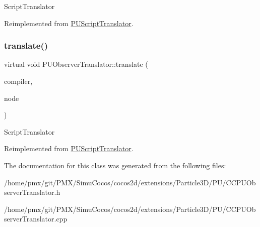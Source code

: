 Script\+Translator 

Reimplemented from \hyperlink{classPUScriptTranslator_a9ff2cdfda9ea8db6fd716e7b69dbe79b}{P\+U\+Script\+Translator}.

\mbox{\label{classPUObserverTranslator_a06d960394aa02aecdc5208c0aefb18ac}} 
\subsubsection{\texorpdfstring{translate()}{translate()}\hspace{0.1cm}{\footnotesize\ttfamily [2/2]}}
{\footnotesize\ttfamily virtual void P\+U\+Observer\+Translator\+::translate (\begin{DoxyParamCaption}\item[{\hyperlink{classPUScriptCompiler}{P\+U\+Script\+Compiler} $\ast$}]{compiler,  }\item[{\hyperlink{classPUAbstractNode}{P\+U\+Abstract\+Node} $\ast$}]{node }\end{DoxyParamCaption})\hspace{0.3cm}{\ttfamily [virtual]}}

Script\+Translator 

Reimplemented from \hyperlink{classPUScriptTranslator_a9ff2cdfda9ea8db6fd716e7b69dbe79b}{P\+U\+Script\+Translator}.



The documentation for this class was generated from the following files\+:\begin{DoxyCompactItemize}
\item 
/home/pmx/git/\+P\+M\+X/\+Simu\+Cocos/cocos2d/extensions/\+Particle3\+D/\+P\+U/C\+C\+P\+U\+Observer\+Translator.\+h\item 
/home/pmx/git/\+P\+M\+X/\+Simu\+Cocos/cocos2d/extensions/\+Particle3\+D/\+P\+U/C\+C\+P\+U\+Observer\+Translator.\+cpp\end{DoxyCompactItemize}
